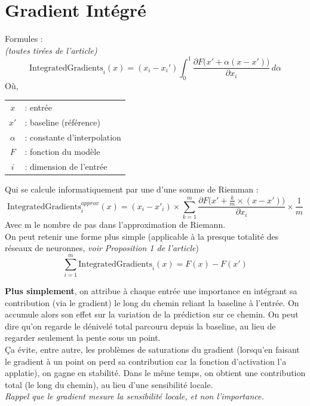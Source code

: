 \documentclass[12pt,a4paper]{article}
\begin{document}
\clearpage

\section*{Gradient Intégré}
Formules :\\
\small\textit{(toutes tirées de l'article)}
\[
\mathrm{IntegratedGradients}_i(x) = (x_i - x_i') \int_{0}^{1} \frac{\partial F\big(x' + \alpha (x - x')\big)}{\partial x_i} \, d\alpha
\]
Où,
\begin{center}
\begin{tabular}{c l}
$x$      & : entrée \\
$x'$     & : baseline (référence) \\
$\alpha$ & : constante d'interpolation \\
$F$      & : fonction du modèle \\
$i$      & : dimension de l'entrée \\
\end{tabular}
\end{center}

Qui se calcule informatiquement par une d'une somme de Riemman :
\[
\mathrm{IntegratedGradients}^{approx}_{i}(x) = (x_i - x'_i)\times\sum_{k=1}^{m} \frac{\partial F\big(x'+\frac{k}{m}\times(x-x')\big)}{\partial x_i}\times\frac{1}{m}
\]
Avec m le nombre de pas dans l'approximation de Riemann.\\

On peut retenir une forme plus simple (applicable à la presque totalité des réseaux de neuronnes, \textit{voir Proposition 1 de l'article})
\[
\sum_{i=1}^{m}\mathrm{IntegratedGradients}_i(x) = F(x) - F(x')
\]

\textbf{Plus simplement}, on attribue à chaque entrée une importance en intégrant sa contribution (via le gradient) le long du chemin reliant la baseline à l'entrée.
On accumule alors son effet sur la variation de la prédiction sur ce chemin.
On peut dire qu'on regarde le dénivelé total parcouru depuis la baseline, au lieu de regarder seulement la pente sous un point.\\

Ça évite, entre autre, les problèmes de saturations du gradient (lorsqu'en faisant le gradient à un point on perd sa contribution car la fonction d'activation l'a applatie), on gagne en stabilité. Dans le même temps, on obtient une contribution total (le long du chemin), au lieu d'une sensibilité locale.\\
\textit{Rappel que le gradient mesure la sensibilité locale, et non l'importance.}

\end{document}
